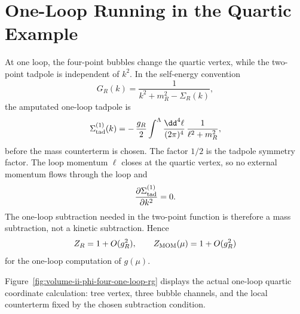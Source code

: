 \section{One-Loop Running in the Quartic Example}

At one loop, the four-point bubbles change the quartic vertex, while the
two-point tadpole is independent of \(k^2\).  In the self-energy convention
\[
  G_R(k)=\frac{1}{k^2+m_R^2-\Sigma_R(k)},
\]
the amputated one-loop tadpole is
\[
  \Sigma^{(1)}_{\rm tad}(k)
  =
  -\,\frac{g_R}{2}
  \int^\Lambda\frac{\dd^4\ell}{(2\pi)^4}\,
  \frac{1}{\ell^2+m_R^2},
\]
before the mass counterterm is chosen.  The factor \(1/2\) is the tadpole
symmetry factor.  The loop momentum \(\ell\) closes at the quartic vertex, so no
external momentum flows through the loop and
\[
  \frac{\partial\Sigma^{(1)}_{\rm tad}}{\partial k^2}=0 .
\]
The one-loop subtraction needed in the two-point function is therefore a mass
subtraction, not a kinetic subtraction.  Hence
\[
  Z_R=1+O(g_R^2),
  \qquad
  Z_{\rm MOM}(\mu)=1+O(g_R^2)
\]
for the one-loop computation of \(g(\mu)\).

Figure~\ref{fig:volume-ii-phi-four-one-loop-rg} displays the actual one-loop
quartic coordinate calculation: tree vertex, three bubble channels, and the
local counterterm fixed by the chosen subtraction condition.

